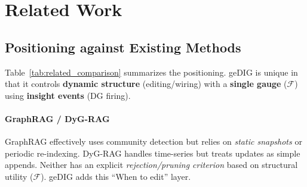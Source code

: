 \documentclass[12pt]{article}
\newcommand{\F}{\mathcal{F}}
\begin{document}
\section{Related Work}
\label{sec:related_work}

\subsection{Positioning against Existing Methods}
Table~\ref{tab:related_comparison} summarizes the positioning.
geDIG is unique in that it controls \textbf{dynamic structure} (editing/wiring) with a \textbf{single gauge} ($\F$) using \textbf{insight events} (DG firing).

\begin{table}[H]
\centering
\caption{Comparison with Related Methods (Layer = Performance / Control / Theory)}
\label{tab:related_comparison}
\small
{}
\end{table}

\paragraph{GraphRAG / DyG-RAG}\;
GraphRAG effectively uses community detection but relies on \emph{static snapshots} or periodic re-indexing. DyG-RAG handles time-series but treats updates as simple appends. Neither has an explicit \emph{rejection/pruning criterion} based on structural utility ($\F$). geDIG adds this ``When to edit'' layer.
\end{document}
